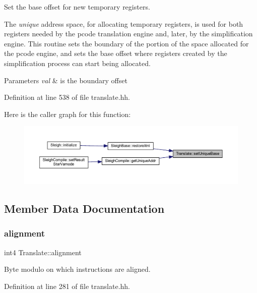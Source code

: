 Set the base offset for new temporary registers. 

The {\itshape unique} address space, for allocating temporary registers, is used for both registers needed by the pcode translation engine and, later, by the simplification engine. This routine sets the boundary of the portion of the space allocated for the pcode engine, and sets the base offset where registers created by the simplification process can start being allocated. 
\begin{DoxyParams}{Parameters}
{\em val} & is the boundary offset \\
\hline
\end{DoxyParams}


Definition at line 538 of file translate.\+hh.

Here is the caller graph for this function\+:
\nopagebreak
\begin{figure}[H]
\begin{center}
\leavevmode
\includegraphics[width=350pt]{class_translate_a57dd5230f05fca5b38e7768472c5b5ee_icgraph}
\end{center}
\end{figure}


\subsection{Member Data Documentation}
\mbox{\label{class_translate_a75455c0e7fa98d8cd490d7c113f099e9}} 
\subsubsection{\texorpdfstring{alignment}{alignment}}
{\footnotesize\ttfamily int4 Translate\+::alignment\hspace{0.3cm}{\ttfamily [protected]}}



Byte modulo on which instructions are aligned. 



Definition at line 281 of file translate.\+hh.

